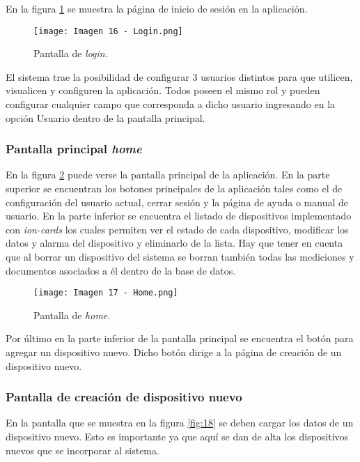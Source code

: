 En la figura \ref{fig:16} se muestra la página de inicio de sesión en la aplicación.

\begin{figure}[h]
\centering
\texttt{[image: Imagen 16 - Login.png]}
\caption[Pantalla login]{Pantalla de \textit{login}. \footnotemark}
\label{fig:16}
\end{figure}

El sistema trae la posibilidad de configurar 3 usuarios distintos para que utilicen, visualicen y configuren la aplicación. Todos poseen el mismo rol y pueden configurar cualquier campo que corresponda a dicho usuario ingresando en la opción Usuario dentro de la pantalla principal.

\subsubsection{Pantalla principal \textit{home}}

En la figura \ref{fig:17} puede verse la pantalla principal de la aplicación. En la parte superior se encuentran los botones principales de la aplicación tales como el de configuración del usuario actual, cerrar sesión y la página de ayuda o manual de usuario. En la parte inferior se encuentra el listado de dispositivos implementado con \textit{ion-cards} los cuales permiten ver el estado de cada dispositivo, modificar los datos y alarma del dispositivo y eliminarlo de la lista. Hay que tener en cuenta que al borrar un dispositivo del sistema se borran también todas las mediciones y documentos asociados a él dentro de la base de datos.

\begin{figure}[h]
\centering
\texttt{[image: Imagen 17 - Home.png]}
\caption[Pantalla home]{Pantalla de \textit{home}. \footnotemark}
\label{fig:17}
\end{figure}

Por último en la parte inferior de la pantalla principal se encuentra el botón para agregar un dispositivo nuevo. Dicho botón dirige a la página de creación de un dispositivo nuevo.

\subsubsection{Pantalla de creación de dispositivo nuevo}

En la pantalla que se muestra en la figura \ref{fig:18} se deben cargar los datos de un dispositivo nuevo. Esto es importante ya que aquí se dan de alta los dispositivos nuevos que se incorporar al sistema.

